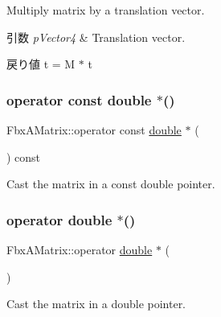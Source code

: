 Multiply matrix by a translation vector. 
\begin{DoxyParams}{引数}
{\em p\+Vector4} & Translation vector. \\
\hline
\end{DoxyParams}
\begin{DoxyReturn}{戻り値}
t\textquotesingle{} = M $\ast$ t 
\end{DoxyReturn}
\mbox{\label{class_fbx_a_matrix_ad166e94a283e603dd71334168b7cb60d}} 
\subsubsection{\texorpdfstring{operator const double $\ast$()}{operator const double *()}}
{\footnotesize\ttfamily Fbx\+A\+Matrix\+::operator const \hyperlink{class_fbx_a_matrix_ad463edbb9fea344643297701f159faa7}{double} $\ast$ (\begin{DoxyParamCaption}{ }\end{DoxyParamCaption}) const}



Cast the matrix in a const double pointer. 

\mbox{\label{class_fbx_a_matrix_a84e411ebdbdf3be933b1db42109da89f}} 
\subsubsection{\texorpdfstring{operator double $\ast$()}{operator double *()}}
{\footnotesize\ttfamily Fbx\+A\+Matrix\+::operator \hyperlink{class_fbx_a_matrix_ad463edbb9fea344643297701f159faa7}{double} $\ast$ (\begin{DoxyParamCaption}{ }\end{DoxyParamCaption})}



Cast the matrix in a double pointer. 

\mbox{\label{class_fbx_a_matrix_a74905b993a9a8a22f8f55024b40be856}} 

